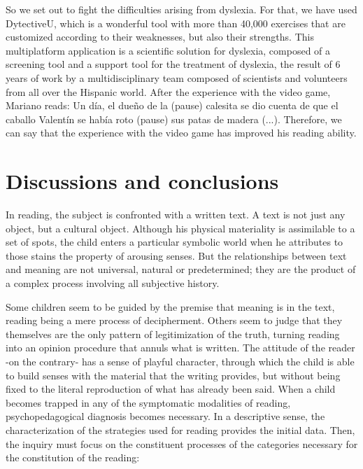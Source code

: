 \documentclass[english]{textolivre}
\begin{document}
So we set out to fight the difficulties arising from dyslexia. For that, we have used DytectiveU, which is a wonderful tool with more than 40,000 exercises that are customized according to their weaknesses, but also their strengths. This multiplatform application is a scientific solution for dyslexia, composed of a screening tool and a support tool for the treatment of dyslexia, the result of 6 years of work by a multidisciplinary team composed of scientists \cite{rello_keyword_2014,rello_how_2017} and volunteers from all over the Hispanic world. After the experience with the video game, Mariano reads: Un día, el dueño de la (pause) calesita se dio cuenta de que el caballo Valentín se había roto (pause) sus patas de madera (...). Therefore, we can say that the experience with the video game has improved his reading ability.

\section{Discussions and conclusions}\label{sec-organizacao}
In reading, the subject is confronted with a written text. A text is not just any object, but a cultural object. Although his physical materiality is assimilable to a set of spots, the child enters a particular symbolic world when he attributes to those stains the property of arousing senses. But the relationships between text and meaning are not universal, natural or predetermined; they are the product of a complex process involving all subjective history.

Some children seem to be guided by the premise that meaning is in the text, reading being a mere process of decipherment. Others seem to judge that they themselves are the only pattern of legitimization of the truth, turning reading into an opinion procedure that annuls what is written. The attitude of the reader -on the contrary- has a sense of playful character, through which the child is able to build senses with the material that the writing provides, but without being fixed to the literal reproduction of what has already been said. When a child becomes trapped in any of the symptomatic modalities of reading, psychopedagogical diagnosis becomes necessary. In a descriptive sense, the characterization of the strategies used for reading provides the initial data. Then, the inquiry must focus on the constituent processes of the categories necessary for the constitution of the reading:
\end{document}
